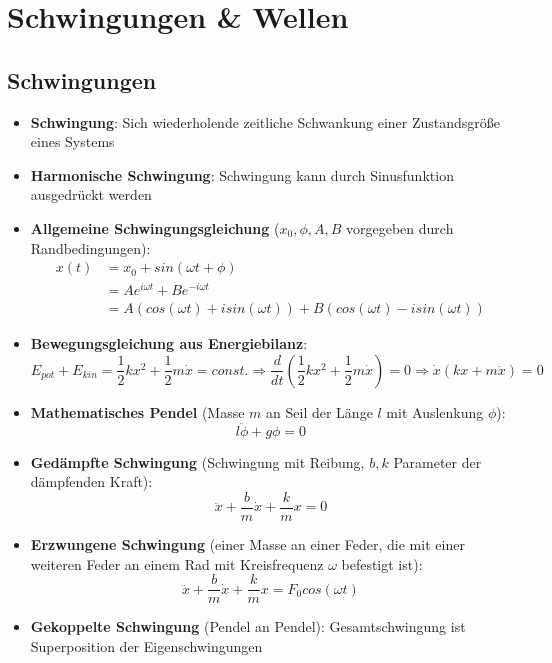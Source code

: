 \section{Schwingungen \& Wellen}%
\label{schwellen:sec:schwellen}

\subsection{Schwingungen}%
\label{schwellen:sub:schwingungen}

\begin{itemize}
	\item \textbf{Schwingung}: Sich wiederholende zeitliche Schwankung einer Zustandsgröße eines Systems
	\item \textbf{Harmonische Schwingung}: Schwingung kann durch Sinusfunktion ausgedrückt werden
	\item \textbf{Allgemeine Schwingungsgleichung} ($x_0, \phi, A, B$ vorgegeben durch Randbedingungen):
	\begin{align*}
		x(t) &= x_0 + sin(\omega t + \phi)\\
			 &= Ae^{i\omega t} + Be^{-i\omega t}\\
			 &= A(cos(\omega t) + isin(\omega t)) + B(cos(\omega t) - isin(\omega t))
	\end{align*}
	\item \textbf{Bewegungsgleichung aus Energiebilanz}:
	\begin{equation}
		E_{pot} + E_{kin} = \frac{1}{2}kx^2 + \frac{1}{2}m\dot{x} = const. \Rightarrow \frac{d}{dt}(\frac{1}{2}kx^2 + \frac{1}{2}m\dot{x}) = 0 \Rightarrow \dot{x}(kx + m\ddot{x}) = 0
	\end{equation}
	\item \textbf{Mathematisches Pendel} (Masse $m$ an Seil der Länge $l$ mit Auslenkung $\phi$):
	\begin{equation}
		l\ddot{\phi} + g\phi = 0
	\end{equation}
	\item \textbf{Gedämpfte Schwingung} (Schwingung mit Reibung, $b, k$ Parameter der dämpfenden Kraft):
	\begin{equation}
		\ddot{x} + \frac{b}{m}\dot{x} + \frac{k}{m}x = 0
	\end{equation}
	\item \textbf{Erzwungene Schwingung} (einer Masse an einer Feder, die mit einer weiteren Feder an einem Rad mit Kreisfrequenz $\omega$ befestigt ist):
	\begin{equation}
		\ddot{x} + \frac{b}{m}\dot{x} + \frac{k}{m}x = F_0cos(\omega t)
	\end{equation}
	\item \textbf{Gekoppelte Schwingung} (Pendel an Pendel): Gesamtschwingung ist Superposition der Eigenschwingungen
\end{itemize}

